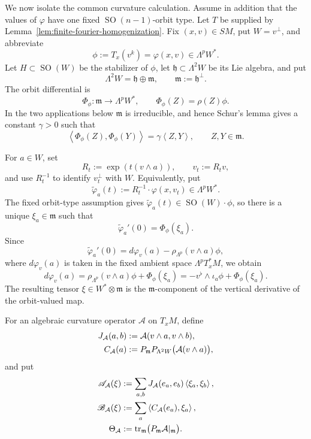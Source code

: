\documentclass[reqno,11pt]{amsart}
\theoremstyle{definition}
\newcommand{\SM}{SM}
\newcommand{\cA}{\mathcal A}
\newcommand{\SO}{\operatorname{SO}}
\newcommand{\inner}[2]{\left\langle #1,#2\right\rangle}
\begin{document}
We now isolate the common curvature calculation.  Assume in addition that
the values of $\varphi$ have one fixed $\SO(n-1)$-orbit type.  Let $T$ be supplied by
Lemma~\ref{lem:finite-fourier-homogenization}.  Fix $(x,v)\in\SM$, put
$W=v^\perp$, and abbreviate
$$
 \phi:=T_x(v^k)=\varphi(x,v)\in\Lambda^pW^*.
$$
Let $H\subset\SO(W)$ be the stabilizer of $\phi$, let
$\mathfrak h\subset\Lambda^2W$ be its Lie algebra, and put
\begin{equation*}
 \Lambda^2W=\mathfrak h\oplus\mathfrak m,
 \qquad \mathfrak m:=\mathfrak h^\perp.
\end{equation*}
The orbit differential is
\begin{equation}\label{eq:orbit-differential}
 \Phi_\phi:\mathfrak m\longrightarrow\Lambda^pW^*,
 \qquad \Phi_\phi(Z)=\rho(Z)\phi.
\end{equation}
In the two applications below $\mathfrak m$ is irreducible, and hence
Schur's lemma gives a constant $\gamma>0$ such that
\begin{equation}\label{eq:orbit-homothety}
 \inner{\Phi_\phi(Z)}{\Phi_\phi(Y)}
 =\gamma\inner{Z}{Y},
 \qquad Z,Y\in\mathfrak m.
\end{equation}

For $a\in W$, set
$$
 R_t:=\exp(t(v\wedge a)),\qquad v_t:=R_tv,
$$
and use $R_t^{-1}$ to identify $v_t^\perp$ with $W$.  Equivalently, put
$$
 \widetilde\varphi_a(t):=R_t^{-1}\cdot\varphi(x,v_t)
 \in\Lambda^pW^*.
$$
The fixed orbit-type assumption gives
$\widetilde\varphi_a(t)\in\SO(W)\cdot\phi$, so there is a unique
$\xi_a\in\mathfrak m$ such that
$$
 \widetilde\varphi_a'(0)=\Phi_\phi(\xi_a).
$$
Since
$$
 \widetilde\varphi_a'(0)
 =d\varphi_v(a)-\rho_{\Lambda^p}(v\wedge a)\phi,
$$
where $d\varphi_v(a)$ is taken in the fixed ambient space
$\Lambda^pT_x^*M$, we obtain
\begin{equation}\label{eq:vertical-orbit-derivative}
 d\varphi_v(a)
 =\rho_{\Lambda^p}(v\wedge a)\phi+\Phi_\phi(\xi_a)
 =-v^\flat\wedge\iota_a\phi+\Phi_\phi(\xi_a).
\end{equation}
The resulting tensor $\xi\in W^*\otimes\mathfrak m$ is the
$\mathfrak m$-component of the vertical derivative of the orbit-valued map.

For an algebraic curvature operator $\cA$ on $T_xM$, define
\begin{align}
 J_{\cA}(a,b)
 &:=\cA(v\wedge a,v\wedge b),
 \label{eq:orbit-Jacobi-block}\\
 C_{\cA}(a)
 &:=P_{\mathfrak m}P_{\Lambda^2W}\bigl(\cA(v\wedge a)\bigr),
 \notag
\end{align}
and put
\begin{align}
 \mathscr A_{\cA}(\xi)
 &:=\sum_{a,b}J_{\cA}(e_a,e_b)\inner{\xi_a}{\xi_b},
 \label{eq:orbit-A-form}\\
 \mathscr B_{\cA}(\xi)
 &:=\sum_a\inner{C_{\cA}(e_a)}{\xi_a},
 \notag\\
 \Theta_{\cA}
 &:=\operatorname{tr}_{\mathfrak m}
 \bigl(P_{\mathfrak m}\cA|_{\mathfrak m}\bigr).
 \label{eq:orbit-trace-form}
\end{align}
\end{document}
